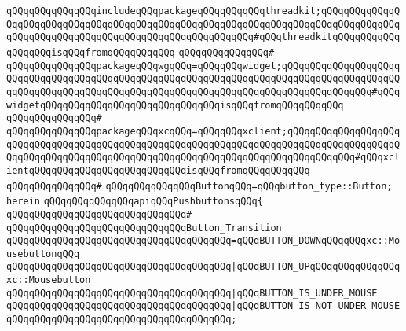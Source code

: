 \verb|qQQqqQQqqQQqqQQqincludeqQQqpackageqQQqqQQqqQQqthreadkit;qQQqqQQqqQQqqQQqqQQqqQQqqQQqqQQqqQQqqQQqqQQqqQQqqQQqqQQqqQQqqQQqqQQqqQQqqQQqqQQqqQQqqQQqqQQqqQQqqQQqqQQqqQQqqQQqqQQqqQQqqQQqqQQq#qQQqthreadkitqQQqqQQqqQQqqQQqqQQqisqQQqfromqQQqqQQqqQQq|\newline
\verb|qQQqqQQqqQQqqQQq#|\newline
\verb|qQQqqQQqqQQqqQQqpackageqQQqwgqQQq=qQQqqQQqwidget;qQQqqQQqqQQqqQQqqQQqqQQqqQQqqQQqqQQqqQQqqQQqqQQqqQQqqQQqqQQqqQQqqQQqqQQqqQQqqQQqqQQqqQQqqQQqqQQqqQQqqQQqqQQqqQQqqQQqqQQqqQQqqQQqqQQqqQQqqQQqqQQqqQQqqQQqqQQq#qQQqwidgetqQQqqQQqqQQqqQQqqQQqqQQqqQQqqQQqisqQQqfromqQQqqQQqqQQq|\newline
\verb|qQQqqQQqqQQqqQQq#|\newline
\verb|qQQqqQQqqQQqqQQqpackageqQQqxcqQQq=qQQqqQQqxclient;qQQqqQQqqQQqqQQqqQQqqQQqqQQqqQQqqQQqqQQqqQQqqQQqqQQqqQQqqQQqqQQqqQQqqQQqqQQqqQQqqQQqqQQqqQQqqQQqqQQqqQQqqQQqqQQqqQQqqQQqqQQqqQQqqQQqqQQqqQQqqQQqqQQqqQQq#qQQqxclientqQQqqQQqqQQqqQQqqQQqqQQqqQQqisqQQqfromqQQqqQQqqQQq|\newline
\verb|qQQqqQQqqQQqqQQq#|\newline
\verb|qQQqqQQqqQQqqQQqButtonqQQq=qQQqbutton_type::Button;|\newline
\verb|herein|\newline
\newline
\verb|qQQqqQQqqQQqqQQqapiqQQqPushbuttonsqQQq{|\newline
\verb|qQQqqQQqqQQqqQQqqQQqqQQqqQQqqQQq#|\newline
\verb|qQQqqQQqqQQqqQQqqQQqqQQqqQQqqQQqButton_Transition|\newline
\verb|qQQqqQQqqQQqqQQqqQQqqQQqqQQqqQQqqQQqqQQq=qQQqBUTTON_DOWNqQQqqQQqxc::MousebuttonqQQq|\newline
\verb|qQQqqQQqqQQqqQQqqQQqqQQqqQQqqQQqqQQqqQQq|\verb#|qQQqBUTTON_UPqQQqqQQqqQQqqQQqxc::Mousebutton#\newline
\verb|qQQqqQQqqQQqqQQqqQQqqQQqqQQqqQQqqQQqqQQq|\verb#|qQQqBUTTON_IS_UNDER_MOUSE#\newline
\verb|qQQqqQQqqQQqqQQqqQQqqQQqqQQqqQQqqQQqqQQq|\verb#|qQQqBUTTON_IS_NOT_UNDER_MOUSE#\newline
\verb|qQQqqQQqqQQqqQQqqQQqqQQqqQQqqQQqqQQqqQQq;|\newline
